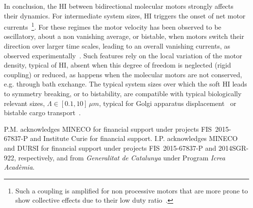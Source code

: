 \documentclass[prl,aps,twocolumn, floatfix, superscriptaddress,showpacs]{revtex4}
\begin{document}
In conclusion, the HI between bidirectional molecular motors strongly affects their dynamics. For intermediate system sizes, HI triggers the onset of net motor currents~\footnote{Such a coupling is amplified for non processive motors that are more prone to show collective effects due to their low duty ratio~\cite{bloemink}.}. For these regimes the motor velocity has been observed to be oscillatory, about a non vanishing average, or bistable, when motors switch their direction over larger time scales, leading to an overall vanishing currents, as observed experimentally~\cite{Nebenfuhr01121999,Hendricks,Warshaw,goldman2010}. Such features rely on the local variation of the motor density, typical of HI, absent when this degree of freedom is neglected (rigid coupling) or reduced, as happens when the molecular motors are not conserved, e.g. through bath exchange. 
The typical system sizes over which the soft HI leads to symmetry breaking, or to bistability, are compatible with typical biologically relevant sizes, $\Lambda \in [0.1,10] \,\mu m$, typical for Golgi apparatus displacement~\cite{Nebenfuhr01121999} or bistable cargo transport~\cite{Hendricks,Warshaw,goldman2010}. 

P.M. acknowledges MINECO for
financial  support under  projects  FIS\  2015-67837-P and Institute Curie for financial support.
 I.P.  acknowledges MINECO and  DURSI for
financial  support under  projects  FIS\  2015-67837-P and  2014SGR-922,
respectively, and from  {\sl Generalitat de Catalunya  } under Program
{\sl Icrea Acad\`emia}.

\end{document}
